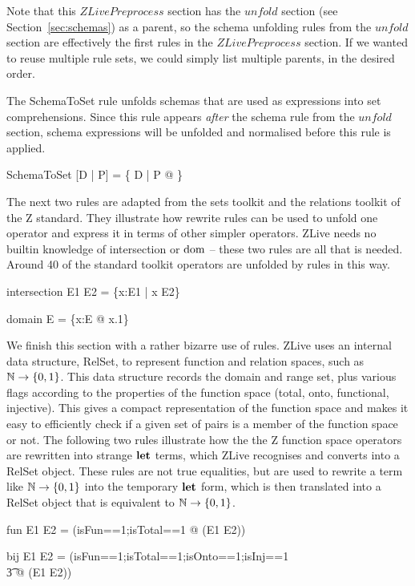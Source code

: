 \documentclass{entcs}
\begin{document}
Note that this $ZLivePreprocess$ section has the $unfold$ section (see
Section~\ref{sec:schemas}) as a parent, so the schema unfolding rules
from the $unfold$ section are effectively the first rules in the
$ZLivePreprocess$ section.  If we wanted to reuse multiple rule sets,
we could simply list multiple parents, in the desired order.

The SchemaToSet rule unfolds schemas that are used as expressions into
set comprehensions.  Since this rule appears \emph{after} the schema
rule from the $unfold$ section, schema expressions will be unfolded
and normalised before this rule is applied.
\begin{zedrule}{SchemaToSet}
[D | P] = \{ D | P @ \theta [D | true] \}
\end{zedrule}

The next two rules are adapted from the sets toolkit and the
relations toolkit of the Z standard.  They illustrate how rewrite rules
can be used to unfold one operator and express it in terms of other
simpler operators.  ZLive needs no builtin knowledge of intersection
or $\mathop{\mathstrut{\mbox{\textrm{dom}}}}\nolimits$ -- these two rules are all that is needed.  Around 40 of the
standard toolkit operators are unfolded by rules in this way.

\begin{zedrule}{intersection}
   E1 \cap E2 = \{x:E1 | x \in E2\}
\end{zedrule}
\begin{zedrule}{domain}
   \dom E = \{x:E @ x.1\}
\end{zedrule}

We finish this section with a rather bizarre use of rules.  ZLive uses
an internal data structure, RelSet, to represent function and relation
spaces, such as $\nat \fun \{0,1\}$.  This data structure records the
domain and range set, plus various flags according to the properties
of the function space (total, onto, functional, injective).  This
gives a compact representation of the function space and makes it easy
to efficiently check if a given set of pairs is a member of the
function space or not.  The following two rules illustrate how the the
Z function space operators are rewritten into strange $\mathop{\mathstrut{\mbox{\textbf{let}}}}\nolimits$ terms,
which ZLive recognises and converts into a RelSet object.  These rules
are not true equalities, but are used to rewrite a term like $\nat
\fun \{0,1\}$ into the temporary $\mathop{\mathstrut{\mbox{\textbf{let}}}}\nolimits$ form, which is then translated
into a RelSet object that is equivalent to $\nat \fun \{0,1\}$.

\begin{zedrule}{fun}
   E1 \fun E2 = (\LET isFun==1;isTotal==1 @ \power (E1 \cross E2))
\end{zedrule}
\begin{zedrule}{bij}
   E1 \bij E2 = (\LET isFun==1;isTotal==1;isOnto==1;isInj==1 \\
   \t3               @ \power (E1 \cross E2))
\end{zedrule}
\end{document}

